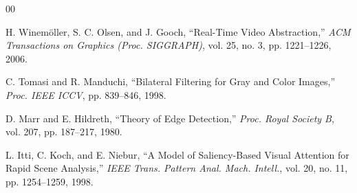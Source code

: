 \documentclass[conference]{IEEEtran}
\begin{document}
\begin{thebibliography}{00}

H. Winemöller, S. C. Olsen, and J. Gooch,
``Real-Time Video Abstraction,''
\textit{ACM Transactions on Graphics (Proc. SIGGRAPH)},
vol. 25, no. 3, pp. 1221--1226, 2006.

C. Tomasi and R. Manduchi,
``Bilateral Filtering for Gray and Color Images,''
\textit{Proc. IEEE ICCV}, pp. 839--846, 1998.

D. Marr and E. Hildreth,
``Theory of Edge Detection,''
\textit{Proc. Royal Society B}, vol. 207, pp. 187--217, 1980.

L. Itti, C. Koch, and E. Niebur,
``A Model of Saliency-Based Visual Attention for Rapid Scene Analysis,''
\textit{IEEE Trans. Pattern Anal. Mach. Intell.},
vol. 20, no. 11, pp. 1254--1259, 1998.

\end{thebibliography}
\end{document}
